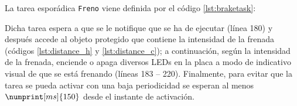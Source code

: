 La tarea esporádica \texttt{Freno} viene definida por el código \ref{lst:braketask}:



Dicha tarea espera a que se le notifique que se ha de ejecutar (línea 180) y después accede
al objeto protegido que contiene la intensidad de la frenada (códigos \ref{lst:distance_h} y
\ref{lst:distance_c}); a continuación, según la intensidad de la frenada, enciende o
apaga diversos LEDs en la placa a modo de indicativo visual de que se está frenando
(líneas 183 -- 220). Finalmente, para evitar que la tarea se pueda activar con una
baja periodicidad se esperan al menos $\numprint[ms]{150}$ desde el instante de activación.
